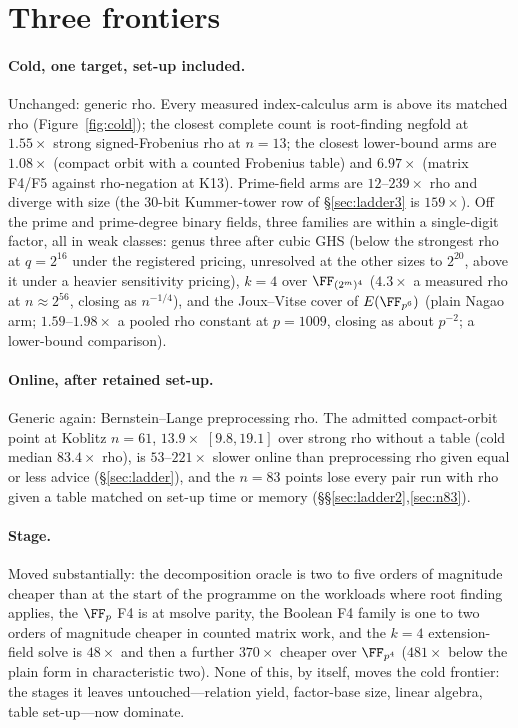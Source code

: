 \section{Three frontiers}

\paragraph{Cold, one target, set-up included.} Unchanged: generic rho.
Every measured index-calculus arm is above its matched rho
(Figure~\ref{fig:cold}); the closest complete count is root-finding negfold
at $1.55\times$ strong signed-Frobenius rho at $n=13$; the closest
lower-bound arms are $1.08\times$ (compact orbit with a counted Frobenius
table) and $6.97\times$ (matrix F4/F5 against rho-negation at K13).
Prime-field arms are $12$--$239\times$ rho and diverge with size (the
30-bit Kummer-tower row of \S\ref{sec:ladder3} is $159\times$). Off the
prime and prime-degree binary fields, three families are within a
single-digit factor, all in weak classes: genus three after cubic GHS
(below the strongest rho at $q=2^{16}$ under the registered pricing,
unresolved at the other sizes to $2^{20}$, above it under a heavier
sensitivity pricing), $k=4$ over $\FF_{(2^m)^4}$
($4.3\times$ a measured rho at $n\approx2^{56}$, closing as $n^{-1/4}$), and
the Joux--Vitse cover of $E(\FF_{p^6})$ (plain Nagao arm; $1.59$--$1.98\times$ a pooled rho
constant at $p=1009$, closing as about $p^{-2}$; a lower-bound comparison).

\paragraph{Online, after retained set-up.} Generic again: Bernstein--Lange
preprocessing rho. The admitted compact-orbit point at Koblitz $n=61$,
$13.9\times$ $[9.8,19.1]$ over strong rho without a table (cold median
$83.4\times$ rho), is $53$--$221\times$ slower online than preprocessing rho
given equal or less advice (\S\ref{sec:ladder}), and the $n=83$ points
lose every pair run with rho given a table matched on set-up time or
memory (\S\S\ref{sec:ladder2},\ref{sec:n83}).

\paragraph{Stage.} Moved substantially: the decomposition oracle is two to
five orders of magnitude cheaper than at the start of the programme on the
workloads where root finding applies, the $\FF_p$ F4 is at msolve parity,
the Boolean F4 family is one to two orders of magnitude cheaper in counted
matrix work, and the $k=4$ extension-field solve is $48\times$ and then a
further $370\times$ cheaper over $\FF_{p^4}$ ($481\times$ below the plain
form in characteristic two).
None of this, by itself, moves the cold frontier: the stages it leaves
untouched---relation yield, factor-base size, linear algebra, table
set-up---now dominate.

